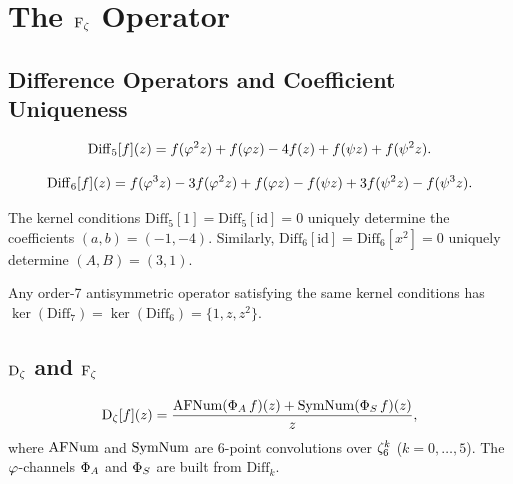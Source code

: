 \chapter{\texorpdfstring{The $\operatorname{F_\zeta}$ Operator}{The Fζ Operator}}
\label{ch:fz}

\section{Difference Operators and Coefficient Uniqueness}

\begin{definition}
\label{def:diff5}
\[
  \mathrm{Diff}_5[f](z) =
    f(\varphi^2 z) + f(\varphi z) - 4f(z) + f(\psi z) + f(\psi^2 z).
\]
\end{definition}

\begin{definition}
\label{def:diff6}
\[
  \mathrm{Diff}_6[f](z) =
    f(\varphi^3 z) - 3f(\varphi^2 z) + f(\varphi z) - f(\psi z) + 3f(\psi^2 z) - f(\psi^3 z).
\]
\end{definition}

\begin{theorem}
\label{thm:coeff-unique}
The kernel conditions
$\mathrm{Diff}_5[1]=\mathrm{Diff}_5[\mathrm{id}]=0$ uniquely determine
the coefficients $(a,b)=(-1,-4)$. Similarly,
$\mathrm{Diff}_6[\mathrm{id}]=\mathrm{Diff}_6[x^2]=0$ uniquely determine
$(A,B)=(3,1)$.
\end{theorem}

\begin{theorem}
\label{thm:diff7-reduction}
Any order-7 antisymmetric operator satisfying the same kernel conditions
has $\ker(\mathrm{Diff}_7) = \ker(\mathrm{Diff}_6) = \{1, z, z^2\}$.
\end{theorem}

\section{\texorpdfstring{$\Dz$ and $\operatorname{F_\zeta}$}{Dζ and Fζ}}

\begin{definition}[$\Dz$ operator]
\label{def:dz}
\[
  \operatorname{D_\zeta}[f](z) = \frac{\operatorname{AFNum}(\Phi_A\,f)(z) + \operatorname{SymNum}(\Phi_S\,f)(z)}{z},
\]
where $\operatorname{AFNum}$ and $\operatorname{SymNum}$ are 6-point convolutions over $\zeta_6^k$ ($k=0,\ldots,5$).
The $\varphi$-channels $\Phi_A$ and $\Phi_S$ are built from $\mathrm{Diff}_k$.
\end{definition}

